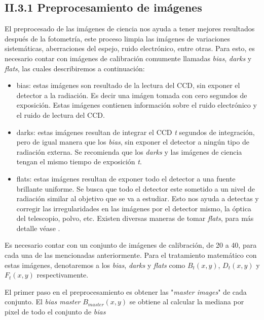 \subsection*{II.3.1 Preprocesamiento de imágenes}

El preprocesado de las imágenes de ciencia nos ayuda a tener mejores resultados después de la fotometría, este proceso limpia las imágenes de variaciones sistemáticas, aberraciones del espejo, ruido electrónico, entre otras. Para esto, es necesario contar con imágenes de calibración comumente llamadas \textit{bias}, \textit{darks} y \textit{flats}, las cuales describiremos a continuación:

\begin{itemize}
  \item bias: estas imágenes son resultado de la lectura del CCD, sin exponer el detector a la radiación. Es decir una imágen tomada con cero segundos de exposición. Estas imágenes contienen información sobre el ruido electrónico y el ruido de lectura del CCD. 
  \item darks: estas imágenes resultan de integrar el CCD \textit{t} segundos de integración, pero de igual manera que los \textit{bias}, sin exponer el detector a ningún tipo de radiación externa. Se recomienda que los \textit{darks} y las imágenes de ciencia tengan el mismo tiempo de exposición \textit{t}.
  \item flats: estas imágenes resultan de exponer todo el detector a una fuente brillante uniforme. Se busca que todo el detector este sometido a un nivel de radiación similar al objetivo que se va a estudiar. Esto nos ayuda a detectas y corregir las irregularidades en las imágenes por el detector mismo, la óptica del telescopio, polvo, etc. Existen diversas maneras de tomar \textit{flats}, para más detalle véase \cite{chromey1996special}.
\end{itemize}

Es necesario contar con un conjunto de imágenes de calibración, de 20 a 40, para cada una de las mencionadas anteriormente. Para el tratamiento matemático con estas imágenes, denotaremos a los \textit{bias}, \textit{darks} y \textit{flats} como $B_{t}(x,y)$, $D_{t}(x,y)$ y $F_{t}(x,y)$ respectivamente.

El primer paso en el preprocesamiento es obtener las "\textit{master images}" de cada conjunto. El \textit{bias master} $B_{master}(x,y)$ se obtiene al calcular la mediana por pixel de todo el conjunto de \textit{bias}

